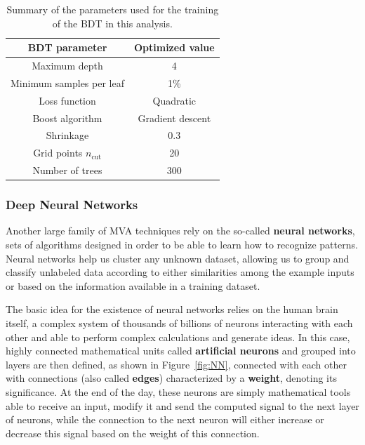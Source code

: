 \documentclass[a4paper, 10pt, openright]{report}
\begin{document}
\begin{table}
\begin{center}
\begin{tabular}{ c|c } 
\hline
 BDT parameter & Optimized value \\
 \hline
 Maximum depth & 4 \\
 Minimum samples per leaf & 1\% \\
 Loss function & Quadratic \\
 Boost algorithm & Gradient descent \\
 Shrinkage & 0.3 \\
 Grid points $n_{\text{cut}}$ & 20 \\
 Number of trees & 300 \\
\hline
\end{tabular}
\caption{Summary of the parameters used for the training of the \ac{BDT} in this analysis.}
\label{table:BDT}
\end{center}
\end{table}

\subsubsection{Deep Neural Networks}\label{section:DNN}

Another large family of \ac{MVA} techniques rely on the so-called \textbf{neural networks}, sets of algorithms designed in order to be able to learn how to recognize patterns. Neural networks help us cluster any unknown dataset, allowing us to group and classify unlabeled data according to either similarities among the example inputs or based on the information available in a training dataset.

The basic idea for the existence of neural networks relies on the human brain itself, a complex system of thousands of billions of neurons interacting with each other and able to perform complex calculations and generate ideas. In this case, highly connected mathematical units called \textbf{artificial neurons} and grouped into layers are then defined, as shown in Figure~\ref{fig:NN}, connected with each other with connections (also called \textbf{edges}) characterized by a \textbf{weight}, denoting its significance. At the end of the day, these neurons are simply mathematical tools able to receive an input, modify it and send the computed signal to the next layer of neurons, while the connection to the next neuron will either increase or decrease this signal based on the weight of this connection.
\end{document}

